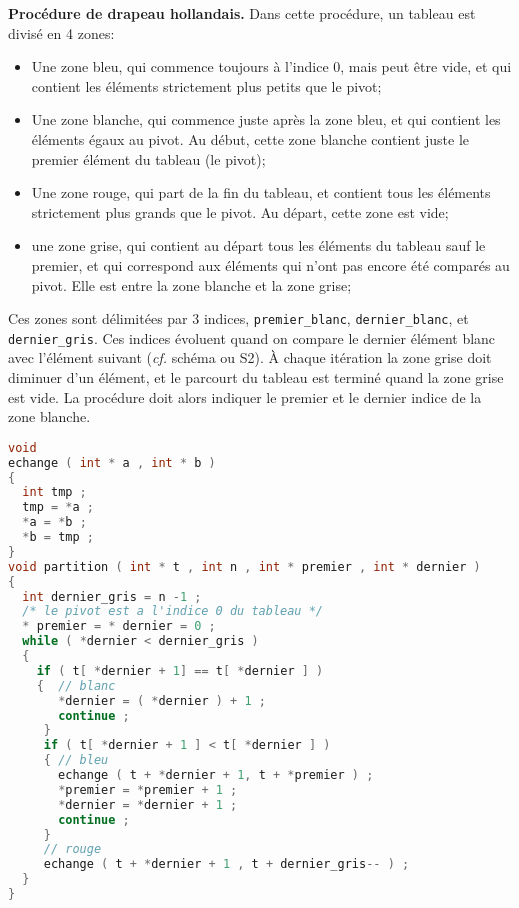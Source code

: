 \question \textbf{Procédure de drapeau hollandais.} Dans cette
procédure, un tableau est divisé en 4 zones:
\begin{itemize}
\item Une zone bleu, qui commence toujours à l'indice 0, mais peut
  être vide, et qui contient les éléments strictement plus petits que
  le pivot;
\item Une zone blanche, qui commence juste après la zone bleu, et qui
  contient les éléments égaux au pivot. Au début, cette zone blanche
  contient juste le premier élément du tableau (le pivot);
\item Une zone rouge, qui part de la fin du tableau, et contient tous
  les éléments strictement plus grands que le pivot. Au départ, cette
  zone est vide;
\item une zone grise, qui contient au départ tous les éléments du
  tableau sauf le premier, et qui correspond aux éléments qui n'ont
  pas encore été comparés au pivot. Elle est entre la zone blanche et
  la zone grise;
\end{itemize}
Ces zones sont délimitées par 3 indices, \texttt{premier\_blanc},
\texttt{dernier\_blanc}, et \texttt{dernier\_gris}.  Ces indices
évoluent quand on compare le dernier élément blanc avec l'élément
suivant (\textit{cf.} schéma ou S2). À chaque itération la zone grise
doit diminuer d'un élément, et le parcourt du tableau est terminé
quand la zone grise est vide. La procédure doit alors indiquer le
premier et le dernier indice de la zone blanche.

\begin{solutioncachee}
  \begin{lstlisting}[language=C]
void
echange ( int * a , int * b )
{
  int tmp ;
  tmp = *a ;
  *a = *b ;
  *b = tmp ;
}
void partition ( int * t , int n , int * premier , int * dernier )
{
  int dernier_gris = n -1 ;
  /* le pivot est a l'indice 0 du tableau */
  * premier = * dernier = 0 ;
  while ( *dernier < dernier_gris )
  {
    if ( t[ *dernier + 1] == t[ *dernier ] )
    {  // blanc
       *dernier = ( *dernier ) + 1 ;
       continue ;
     }
     if ( t[ *dernier + 1 ] < t[ *dernier ] )
     { // bleu
       echange ( t + *dernier + 1, t + *premier ) ;
       *premier = *premier + 1 ;
       *dernier = *dernier + 1 ;
       continue ;
     }
     // rouge
     echange ( t + *dernier + 1 , t + dernier_gris-- ) ;
  }
}    
  \end{lstlisting}
\end{solutioncachee}



